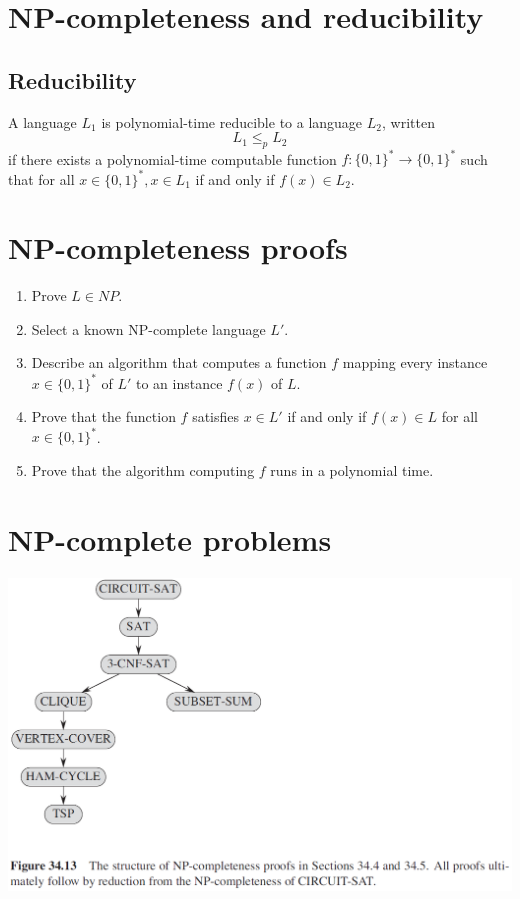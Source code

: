 \documentclass[letter]{book}
\theoremstyle{definition}
\theoremstyle{definition}
\theoremstyle{remark}
\begin{document}
\section{NP-completeness and reducibility}
\subsection{Reducibility}
A language $L_1$ is polynomial-time reducible to a language $L_2$, written 
    \begin{equation*}
        L_1\leq_p L_2       
    \end{equation*}
if there exists a polynomial-time computable function $f:\{0,1\}^*\rightarrow\{0,1\}^*$ such that for all $x\in \{0,1\}^*, x\in L_1$ if and only if $f(x)\in L_2$.

\section{NP-completeness proofs}
\begin{enumerate}
    \item Prove $L\in NP$.
    \item Select a known NP-complete language $L'$.
    \item Describe an algorithm that computes a function $f$ mapping every instance $x\in\{0,1\}^*$ of $L'$ to an instance $f(x)$ of $L$.
    \item Prove that the function $f$ satisfies $x\in L'$ if and only if $f(x)\in L$ for all $x\in \{0,1\}^*$.
    \item Prove that the algorithm computing $f$ runs in a polynomial time.
\end{enumerate}

\section{NP-complete problems}
\includegraphics[scale=0.6]{"Figure34-13"}
\end{document}
